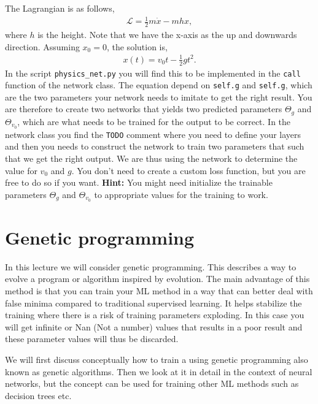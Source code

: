 \documentclass[12pt,a4paper]{article} %
\numberwithin{equation}{section}
\begin{document}
		The Lagrangian is as follows,
		\begin{gather}
			\mathcal{L} = \frac{1}{2} m \dot{x} - mhx,
		\end{gather}
		where $h$ is the height. Note that we have the x-axis as the up and downwards direction. Assuming $x_0=0$, the solution is,
		\begin{gather}
			x(t) = v_0 t - \frac{1}{2} g t^2.
		\end{gather}
		In the script \texttt{physics\_net.py} you will find this to be implemented in the \texttt{call} function of the network class. The equation depend on \texttt{self.g} and \texttt{self.g}, which are the two parameters your network needs to imitate to get the right result. You are therefore to create two networks that yields two predicted parameters $\Theta_g$ and $\Theta_{v_0}$, which are what needs to be trained for the output to be correct. In the network class you find the \texttt{TODO} comment where you need to define your layers and then you needs to construct the network to train two parameters that such that we get the right output. We are thus using the network to determine the value for $v_0$ and $g$. You don't need to create a custom loss function, but you are free to do so if you want.\newline
		\textbf{Hint:} You might need initialize the trainable parameters $\Theta_g$ and $\Theta_{v_0}$ to appropriate values for the training to work.\newline
	
\section{Genetic programming}
	In this lecture we will consider genetic programming. This describes a way to evolve a program or algorithm inspired by evolution. The main advantage of this method is that you can train your ML method in a way that can better deal with false minima compared to traditional supervised learning. It helps stabilize the training where there is a risk of training parameters exploding. In this case you will get infinite or Nan (Not a number) values that results in a poor result and these parameter values will thus be discarded.
	
	We will first discuss conceptually how to train a using genetic programming also known as genetic algorithms. Then we look at it in detail in the context of neural networks, but the concept can be used for training other ML methods such as decision trees etc.
	
\end{document}
